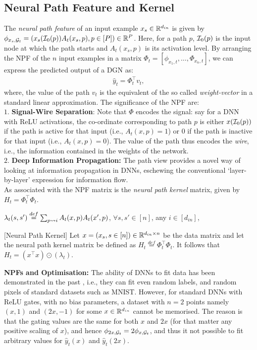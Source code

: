 \subsection{Neural Path Feature and Kernel}
The \emph{neural path feature} of an input example $x_s\in \mathbb{R}^{d_{in}}$ is given by $\phi_{x_s,\mathcal{G}_t}=(x_s(\mathcal{I}_0(p))A_t(x_s,p) ,p\in[P])\in\mathbb{R}^P$. Here, for a path $p$, $\mathcal{I}_0(p)$ is the input node at which the path starts and $A_t(x_s,p)$ is its activation level. By arranging the NPF of the $n$ input examples in a matrix $\Phi_t=\left[\phi_{x_1,t},\ldots, \Phi_{x_n,t}\right]$, we can express the predicted output of a DGN as: 
\begin{align}\label{eq:npfbasic}
\hat{y}_t=\Phi_t^\top v_t,
\end{align}
where, the value of the path $v_t$ is the equivalent of the so called \emph{weight-vector} in a standard linear approximation. 
The significance of the NPF are:\hfill\\
$1.$ \textbf{Signal-Wire Separation}: Note that $\Phi$ encodes the signal: say for a DNN with ReLU activations, the co-ordinate corresponding to path $p$ is either $x(\mathcal{I}_0(p))$ if the path is active for that input (i.e., $A_t(x,p)=1$) or $0$ if the path is inactive for that input  (i.e., $A_t(x,p)=0$). The value of the path thus encodes the \emph{wire}, i.e., the information contained in the weights of the network. \hfill\\
$2.$ \textbf{Deep Information Propagation:} The path view provides a novel way of looking at information propagation in DNNs, eschewing the conventional `layer-by-layer' expression for information flow.\hfill\\
As associated with the NPF matrix is the \emph{neural path kernel} matrix, given by $H_t=\Phi^\top_t\Phi_t$. 
\begin{definition}\label{def:lambda}
$\lambda_t(s,s')\stackrel{def}{=}\sum_{p\rightsquigarrow i} A_t(x,p) A_t(x',p)$, $\forall s,s'\in[n]$, any $i\in [d_{in}]$,  
 \end{definition} 
\begin{lemma}\label{lm:npk}[Neural Path Kernel] 
Let $x=(x_s,s\in [n])\in\mathbb{R}^{d_{in}\times n}$ be the data matrix and let the neural path kernel matrix be defined as $H_t\stackrel{def}=\Phi^\top_t\Phi_t$. It follows that $H_t= (x^\top x)\odot(\lambda_t)$. 
\end{lemma}
\textbf{NPFs and Optimisation:} The ability of DNNs to fit data has been demonstrated in the past \cite{ben}, i.e., they can fit even random labels, and random pixels of standard datasets such as MNIST. However, for standard DNNs with ReLU gates, with no bias parameters, a dataset with $n=2$ points namely $(x,1)$ and $(2x,-1)$ for some $x\in \mathbb{R}^{d_{in}}$ cannot be memorised. The reason is that the gating values are the same for both $x$ and $2x$ (for that matter any positive scaling of $x$), and hence $\phi_{2x,\mathcal{G}_t }= 2\phi_{x,\mathcal{G}_t }$, and thus it not possible to fit arbitrary values for $\hat{y}_t(x)$ and $\hat{y}_t(2x)$.\\
